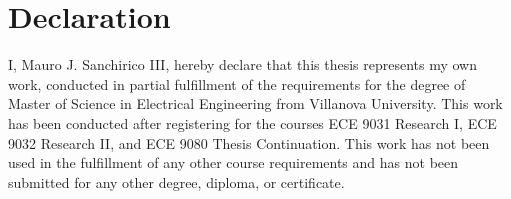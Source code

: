 \chapter*{Declaration}
I, Mauro J. Sanchirico III, hereby declare that this thesis represents my
own work, conducted in partial fulfillment of the requirements for the degree of
Master of Science in Electrical Engineering from Villanova University.
This work has been conducted after registering for the courses
ECE 9031 Research I, ECE 9032 Research II, and ECE 9080 Thesis Continuation.
This work has not been used in the fulfillment of any other course
requirements and has not been submitted for any other degree,
diploma, or certificate.
